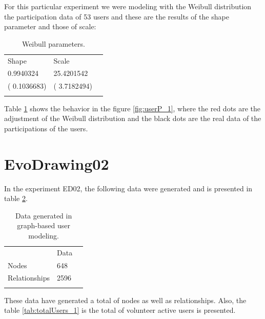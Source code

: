 For this particular experiment we were modeling with the Weibull distribution
\cite{weibull1951wide} the participation data of 53 users and these are the
results of the shape parameter and those of scale:

\begin{table}
\small
\caption{Weibull parameters.}
\label{tab:weibullp_1}
\centering
\small
\begin{tabular}{p{3cm} p{3cm} p{3cm} }
\hline\noalign{\smallskip}
Shape  & Scale &  \\
\noalign{\smallskip}\hline\noalign{\smallskip}
\small{0.9940324} & \small{25.4201542} & \\ \hline
\small{( 0.1036683)} & \small{( 3.7182494)} & \\ \hline

\noalign{\smallskip}\hline
\end{tabular}
\end{table}

Table \ref{tab:weibullp_1} shows the behavior in the figure
\ref{fig:userP_1}, where the red dots are the adjustment of the Weibull
distribution and the black dots are the real data of the participations of the
users.



\section {EvoDrawing02}


In the experiment ED02, the following data were generated and is
presented in table \ref{tab:dataGenerated_2}.


\begin{table}
\small
\caption{Data generated in graph-based user modeling.}
\label{tab:dataGenerated_2}
\centering
\small
\begin{tabular}{p{3cm} p{3cm} p{3cm} }
\hline\noalign{\smallskip}
  & Data &  \\
\noalign{\smallskip}\hline\noalign{\smallskip}
\small{Nodes} & \small{648} & \\ \hline
\small{Relationships} & \small{2596} & \\ \hline

\noalign{\smallskip}\hline
\end{tabular}
\end{table}

These data have generated a total of nodes as well as relationships. Also, the table
\ref{tab:totalUsers_1} is the total of volunteer active users is presented.

